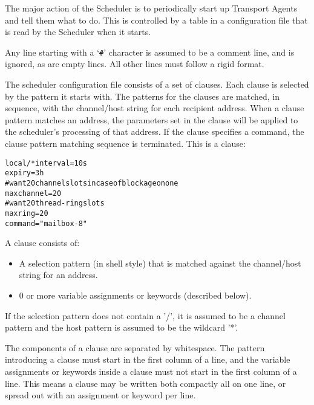 
The major action of the Scheduler is to periodically start up Transport
Agents and tell them what to do.  This is controlled by a table in a
configuration file that is read by the Scheduler when it starts.  

Any line starting with a `{\tt \#}' character is assumed to be a comment 
line, and is ignored, as are empty lines.  All other lines must follow a rigid
format. 

The scheduler configuration file consists of a set  of
clauses. Each clause is selected by the pattern it starts
with. The patterns  for  the  clauses   are  matched,  in
sequence, with the channel/host string for each recipient
address. When a clause pattern matches  an  address,  the
parameters set in the clause will be applied to the scheduler's 
processing of that address. If the clause specifies a command,  
the clause pattern matching sequence is terminated. This is a clause:

\begin{alltt}
    local/*   interval=10s
              expiry=3h
              # want 20 channel slots in case of blockage on one
              maxchannel=20
              # want 20 thread-ring slots
              maxring=20
              command="mailbox -8"
\end{alltt}

A clause consists of:

\begin{itemize}
\item A selection pattern  (in  shell style) that  is
matched  against        the  channel/host  string  for an
address.
\item 0  or more  variable assignments or keywords
(described below).
\end{itemize}


If the selection pattern does not contain a '/', it is
assumed to be a channel pattern and the host  pattern  is
assumed to be the wildcard '*'.

The components of a clause are separated by whitespace.
The pattern introducing a clause must start in the first
column of a line, and the variable assignments or keywords
inside a clause must not start in the first  column of a
line. This means a clause may be written both compactly
all on one line, or spread out with an assignment or keyword per line.

